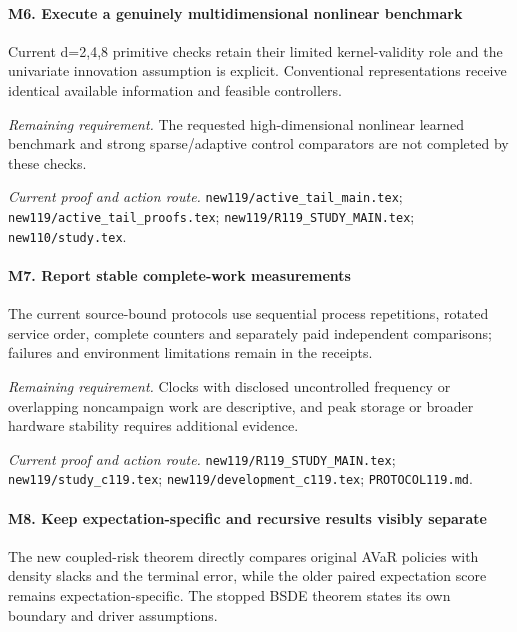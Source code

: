 \paragraph{M6. Execute a genuinely multidimensional nonlinear benchmark}

Current d=2,4,8 primitive checks retain their limited kernel-validity role and the univariate innovation assumption is explicit. Conventional representations receive identical available information and feasible controllers.

\par\emph{Remaining requirement.} The requested high-dimensional nonlinear learned benchmark and strong sparse/\allowbreak{}adaptive control comparators are not completed by these checks.

\par\emph{Current proof and action route.} \nolinkurl{new119/active_tail_main.tex}; \nolinkurl{new119/active_tail_proofs.tex}; \nolinkurl{new119/R119_STUDY_MAIN.tex}; \nolinkurl{new110/study.tex}.

\paragraph{M7. Report stable complete-work measurements}

The current source-bound protocols use sequential process repetitions, rotated service order, complete counters and separately paid independent comparisons; failures and environment limitations remain in the receipts.

\par\emph{Remaining requirement.} Clocks with disclosed uncontrolled frequency or overlapping noncampaign work are descriptive, and peak storage or broader hardware stability requires additional evidence.

\par\emph{Current proof and action route.} \nolinkurl{new119/R119_STUDY_MAIN.tex}; \nolinkurl{new119/study_c119.tex}; \nolinkurl{new119/development_c119.tex}; \nolinkurl{PROTOCOL119.md}.

\paragraph{M8. Keep expectation-specific and recursive results visibly separate}

The new coupled-risk theorem directly compares original AVaR policies with density slacks and the terminal error, while the older paired expectation score remains expectation-specific. The stopped BSDE theorem states its own boundary and driver assumptions.


